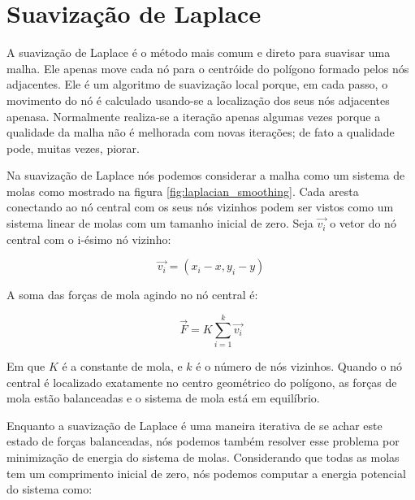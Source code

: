 

\section{Suavização de Laplace}

A suavização de Laplace é o método mais comum e direto para suavisar uma malha. Ele apenas move cada nó para o centróide do polígono formado pelos nós adjacentes. Ele é um algoritmo de suavização local porque, em cada passo, o movimento do nó é calculado usando-se a localização dos seus nós adjacentes apenasa. Normalmente realiza-se a iteração apenas algumas vezes porque a qualidade da malha não é melhorada com novas iterações; de fato a qualidade pode, muitas vezes, piorar. \cite{Zhou}

Na suavização de Laplace nós podemos considerar a malha como um sistema de molas como mostrado na figura \ref{fig:laplacian_smoothing}. Cada aresta conectando ao nó central com os seus nós vizinhos podem ser vistos como um sistema linear de molas com um tamanho inicial de zero. Seja $\vec{v_i}$ o vetor do nó central com o i-ésimo nó vizinho:

\begin{equation*}
    \vec{v_i} = (x_i - x, y_i - y)
\end{equation*}

A soma das forças de mola agindo no nó central é:

\begin{equation*}
    \vec{F} = K \sum_{i=1}^k \vec{v_i}
\end{equation*}

Em que $K$ é a constante de mola, e $k$ é o número de nós vizinhos. Quando o nó central é localizado exatamente no centro geométrico do polígono, as forças de mola estão balanceadas e o sistema de mola está em equilíbrio.

Enquanto a suavização de Laplace é uma maneira iterativa de se achar este estado de forças balanceadas, nós podemos também resolver esse problema por minimização de energia do sistema de molas. Considerando que todas as molas tem um comprimento inicial de zero, nós podemos computar a energia potencial do sistema como:


